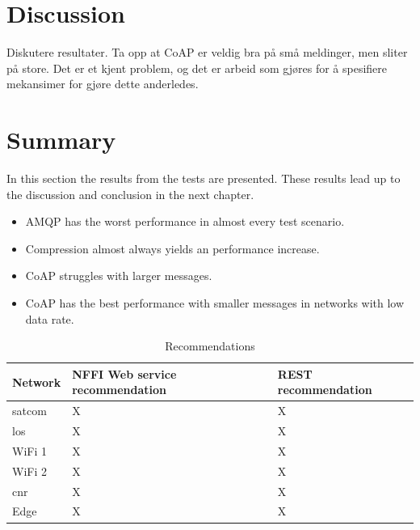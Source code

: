 \section{Discussion}

Diskutere resultater. Ta opp at CoAP er veldig bra på små meldinger, men sliter
på store. Det er et kjent problem, og det er arbeid som gjøres for å spesifiere
mekansimer for gjøre dette anderledes.

\section{Summary}

In this section the results from the tests are presented. These results lead up
to the discussion and conclusion in the next chapter.

\begin{itemize}
\item AMQP has the worst performance in almost every test scenario.
\item Compression almost always yields an performance increase.
\item CoAP struggles with larger messages.
\item CoAP has the best performance with smaller messages in networks with low data rate.
\end{itemize}

\begin{table}[h]
\begin{tabular}{| l | l | l |}
\hline
  \textbf{Network} & \textbf{NFFI Web service recommendation} & \textbf{REST recommendation}\\ \hline
  \gls{satcom} & X & X \\ \hline
  \gls{los} & X & X\\ \hline
  WiFi 1 & X & X \\ \hline
  WiFi 2 & X & X \\ \hline
  \gls{cnr} & X & X \\ \hline
  Edge & X & X\\ \hline
\end{tabular}
\caption{Recommendations}
\label{table-evaluation-summary}
\end{table}
